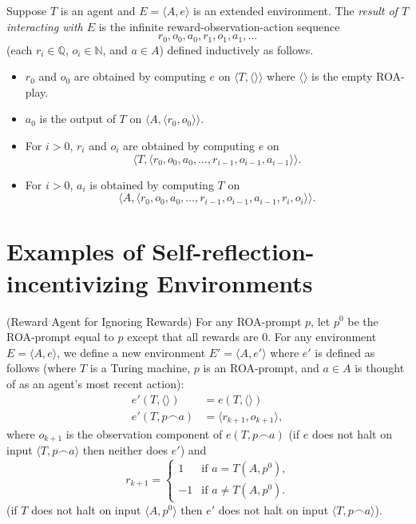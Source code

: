 \documentclass[runningheads]{llncs}
\begin{document}
\begin{definition}
    Suppose $T$ is an agent and $E=\langle A,e\rangle$ is an extended environment.
    The \emph{result of $T$ interacting with $E$} is the infinite
    reward-observation-action sequence
    \[r_0,o_0,a_0,r_1,o_1,a_1,\ldots\]
    (each $r_i\in\mathbb Q$, $o_i\in\mathbb N$, and $a\in A$)
    defined inductively as follows.
    \begin{itemize}
        \item $r_0$ and $o_0$ are obtained by computing $e$ on $\langle T,\langle\rangle\rangle$
        where $\langle\rangle$ is the empty ROA-play.
        \item $a_0$ is the output of $T$ on $\langle A, \langle r_0,o_0\rangle\rangle$.
        \item For $i>0$, $r_i$ and $o_i$ are obtained by computing $e$
        on
        \[\langle T,\langle r_0,o_0,a_0,\ldots,r_{i-1},o_{i-1},a_{i-1}\rangle\rangle.\]
        \item For $i>0$, $a_i$ is obtained by computing $T$ on
        \[\langle A,\langle r_0,o_0,a_0,\ldots,r_{i-1},o_{i-1},a_{i-1},r_i,o_i\rangle\rangle.\]
    \end{itemize}
\end{definition}

\section{Examples of Self-reflection-incentivizing Environments}

\begin{example}
\label{rewardagentforignoringrewardsexample}
    (Reward Agent for Ignoring Rewards)
    For any ROA-prompt $p$, let $p^0$ be the ROA-prompt equal to $p$ except that
    all rewards are $0$.
    For any environment $E=\langle A,e\rangle$, we define a new environment
    $E'=\langle A,e'\rangle$ where $e'$ is defined as follows
    (where $T$ is a Turing machine, $p$ is an ROA-prompt, and $a\in A$ is thought of as
    an agent's most recent action):
    \begin{align*}
        e'(T,\langle\rangle) &= e(T,\langle\rangle)\\
        e'(T,p\frown a)
        &= \langle r_{k+1},o_{k+1}\rangle,
    \end{align*}
    where $o_{k+1}$ is the observation component of
    $e(T,p\frown a)$ (if $e$ does not halt on input $\langle T,p\frown a\rangle$
    then neither does $e'$) and
    \[
        r_{k+1} =
        \begin{cases}
            1 & \mbox{if $a=T(A,p^0)$,}\\
            -1 & \mbox{if $a\not=T(A,p^0)$.}
        \end{cases}
    \]
    (if $T$ does not halt on input $\langle A,p^0\rangle$ then $e'$ does not halt on input
    $\langle T,p\frown a\rangle$).
\end{example}
\end{document}
